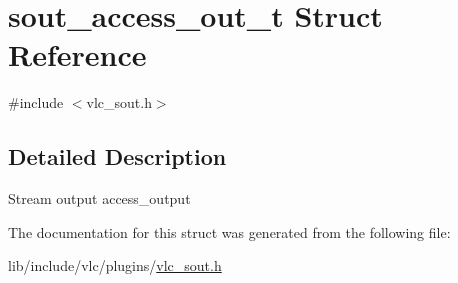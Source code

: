 \hypertarget{structsout__access__out__t}{}\section{sout\+\_\+access\+\_\+out\+\_\+t Struct Reference}
\label{structsout__access__out__t}


{\ttfamily \#include $<$vlc\+\_\+sout.\+h$>$}



\subsection{Detailed Description}
Stream output access\+\_\+output 

The documentation for this struct was generated from the following file\+:\begin{DoxyCompactItemize}
\item 
lib/include/vlc/plugins/\hyperlink{vlc__sout_8h}{vlc\+\_\+sout.\+h}\end{DoxyCompactItemize}
